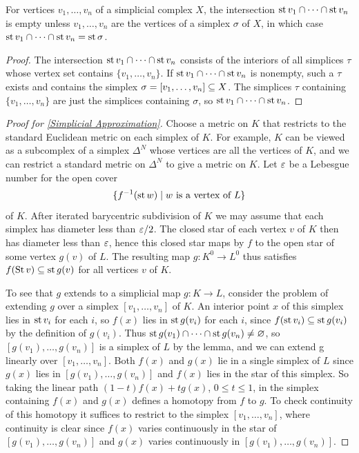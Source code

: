 \begin{lemma}
For vertices $v_1,\dots,v_n$ of a simplicial complex $X$, the intersection $\mathrm{st}\, v_1\cap\cdots\cap\mathrm{st}\, v_n$ is empty unless $v_1,\dots,v_n$ are the vertices of a simplex $\sigma$ of $X$, in which case $\mathrm{st}\, v_1\cap\cdots\cap\mathrm{st}\, v_n=\mathrm{st}\,\sigma$.
\end{lemma}
\begin{proof}
The intersection $\mathrm{st}\, v_1\cap\cdots\cap\mathrm{st}\, v_n$ consists of the interiors of all simplices $\tau$ whose vertex set contains $\{v_1,\dots,v_n\}$. If $\mathrm{st}\, v_1\cap\cdots\cap\mathrm{st}\, v_n$ is nonempty, such a $\tau$ exists and contains the simplex $\sigma=[v_1,\dots,v_n]\subseteq X$. The simplices $\tau$ containing
$\{v_1,\dots,v_n\}$ are just the simplices containing $\sigma$, so $\mathrm{st}\, v_1\cap\cdots\cap\mathrm{st}\, v_n$.
\end{proof}
\begin{proof}[Proof for \cref{Simplicial Approximation}]
Choose a metric on $K$ that restricts to the standard Euclidean metric on each simplex of $K$. For example, $K$ can be viewed as a subcomplex of a simplex $\Delta^N$ whose vertices are all the vertices of $K$, and we can restrict a standard metric on $\Delta^N$ to give a metric on $K$. Let $\varepsilon$ be a Lebesgue number for the open cover
\[\{f^{-1}(\mathrm{st}\, w)\mid w\text{ is a vertex of }L\}\] 
of $K$. After iterated barycentric subdivision of $K$ we may assume that each simplex has diameter less than $\varepsilon/2$. The closed star of each vertex $v$ of $K$ then has diameter less than $\varepsilon$, hence this closed star maps by $f$ to
the open star of some vertex $g(v)$ of $L$. The resulting map $g:K^0\to L^0$ thus satisfies $f(\mathrm{St}\, v)\subseteq\mathrm{st}\, g(v)$ for all vertices $v$ of $K$.\par
To see that $g$ extends to a simplicial map $g:K\to L$, consider the problem of
extending $g$ over a simplex $[v_1,\dots,v_n]$ of $K$. An interior point $x$ of this simplex lies in $\mathrm{st}\, v_i$ for each $i$, so $f(x)$ lies in $\mathrm{st}\, g(v_i)$ for each $i$, since $f(\mathrm{st}\, v_i)\subseteq\mathrm{st}\, g(v_i)$ by the definition of $g(v_i)$. Thus $\mathrm{st}\, g(v_1)\cap\cdots\cap\mathrm{st}\, g(v_n)\neq\varnothing$, so $[g(v_1),\dots,g(v_n)]$ is a simplex of $L$ by the lemma, and we can extend g linearly over $[v_1,\dots,v_n]$. Both $f(x)$ and $g(x)$ lie in a single simplex of $L$ since $g(x)$ lies in $[g(v_1),\dots,g(v_n)]$ and $f(x)$ lies in the star of this simplex. So taking the linear path $(1-t)f(x)+tg(x)$, $0\leq t\leq 1$, in the simplex containing $f(x)$ and $g(x)$ defines a homotopy from $f$ to $g$. To check continuity of this homotopy it suffices to restrict to the simplex $[v_1,\dots,v_n]$, where continuity is clear since $f(x)$ varies continuously in the star of $[g(v_1),\dots,g(v_n)]$ and $g(x)$ varies continuously in $[g(v_1),\dots,g(v_n)]$.
\end{proof}
